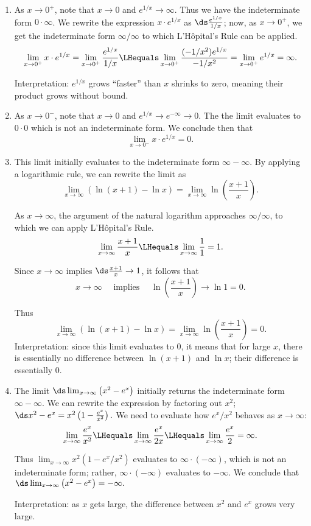 {\begin{enumerate}
	\item	As $x\to 0^+$, note that $x\to 0$ and $e^{1/x}\to \infty$. Thus we have the indeterminate form $0\cdot\infty$. We rewrite the expression $x\cdot e^{1/x}$ as $\ds\frac{e^{1/x}}{1/x}$; now, as $x\to 0^+$, we get the indeterminate form $\infty/\infty$ to which L'H\^opital's Rule can be applied. 
\[
\lim_{x\to0^+} x\cdot e^{1/x} = \lim_{x\to 0^+} \frac{e^{1/x}}{1/x} \LHequals \lim_{x\to 0^+}\frac{(-1/x^2)e^{1/x}}{-1/x^2} =\lim_{x\to 0^+}e^{1/x} =\infty.
\]

Interpretation: $e^{1/x}$ grows ``faster'' than $x$ shrinks to zero, meaning their product grows without bound.

	\item	As $x\to 0^-$, note that $x\to 0$ and $e^{1/x}\to e^{-\infty}\to 0$. The the limit evaluates to $0\cdot 0$ which is not an indeterminate form. We conclude then that
	\[\lim_{x\to 0^-}x\cdot e^{1/x} = 0.\]

	\item	This limit initially evaluates to the indeterminate form $\infty-\infty$. By applying a logarithmic rule, we can rewrite the limit as 
\[
\lim_{x\to\infty}\left(\ln(x+1)-\ln x\right) = \lim_{x\to \infty} \ln \left(\frac{x+1}x\right).
\]

As $x\to \infty$, the argument of the natural logarithm approaches $\infty/\infty$, to which we can apply L'H\^opital's Rule.
\[\lim_{x\to\infty} \frac{x+1}x \LHequals \lim_{x\to\infty}\frac11=1.
\]

Since $x\to\infty$ implies $\ds\frac{x+1}x\to 1$, it follows that 
\[x\to\infty \quad \text{ implies }\quad \ln\left(\frac{x+1}x\right)\to\ln 1=0.\]

Thus
\[
 \lim_{x\to\infty} \left(\ln(x+1)-\ln x\right)
 = \lim_{x\to \infty} \ln \left(\frac{x+1}x\right)=0.
\]
Interpretation: since this limit evaluates to 0, it means that for large $x$, there is essentially no difference between $\ln (x+1)$ and $\ln x$; their difference is essentially 0.

	\item	The limit $\ds \lim_{x\to\infty} \left(x^2-e^x\right)$ initially returns the indeterminate form $\infty-\infty$. We can rewrite the expression by factoring out $x^2$; $\ds x^2-e^x = x^2\left(1-\frac{e^x}{x^2}\right).$ We need to evaluate how $e^x/x^2$ behaves as $x\to\infty$:
\[
\lim_{x\to\infty}\frac{e^x}{x^2} \LHequals \lim_{x\to\infty} \frac{e^x}{2x}
\LHequals \lim_{x\to\infty} \frac{e^x}{2} = \infty.
\]

Thus $\lim_{x\to\infty}x^2(1-e^x/x^2)$ evaluates to $\infty\cdot(-\infty)$, which is not an indeterminate form; rather, $\infty\cdot(-\infty)$ evaluates to $-\infty$. We conclude that 
$\ds \lim_{x\to\infty} \left(x^2-e^x\right) = -\infty.$

Interpretation: as $x$ gets large, the difference between $x^2$ and $e^x$ grows very large.\eoehere
\end{enumerate}}

